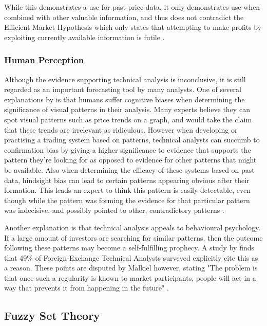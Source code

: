 \documentclass[12pt]{article}
\theoremstyle{definition}
\begin{document}
While this demonstrates a use for past price data, it only demonstrates use when combined with other valuable information, and thus does not contradict the Efficient Market Hypothesis which only states that attempting to make profits by exploiting currently available information is futile \citep{taprofitability}.

\subsubsection{Human Perception}

\label{tahumanz}

Although the evidence supporting technical analysis is inconclusive, it is still regarded as an important forecasting tool by many analysts. One of several explanations by \cite[p.45-71]{aronson2011evidence} is that humans suffer cognitive biases when determining the significance of visual patterns in their analysis. Many experts believe they can spot visual patterns such as price trends on a graph, and would take the claim that these trends are irrelevant as ridiculous. However when developing or practising a trading system based on patterns, technical analysts can succumb to confirmation bias by giving a higher significance to evidence that supports the pattern they're looking for as opposed to evidence for other patterns that might be available. Also when determining the efficacy of these systems based on past data, hindsight bias can lead to certain patterns appearing obvious after their formation. This leads an expert to think this pattern is easily detectable, even though while the pattern was forming the evidence for that particular pattern was indecisive, and possibly pointed to other, contradictory patterns \cite[p.62]{aronson2011evidence}.

Another explanation is that technical analysis appeals to behavioural psychology. If a large amount of investors are searching for similar patterns, then the outcome following these patterns may become a self-fulfilling prophecy. A study by \cite{examininguse1997} finds that 49\% of Foreign-Exchange Technical Analysts surveyed explicitly cite this as a reason. These points are disputed by Malkiel however, stating "The problem is that once such a regularity is known to market participants, people will act in a way that prevents it from happening in the future" \cite[p.162]{randomwalk2012}.

\subsection{Fuzzy Set Theory}
\end{document}
